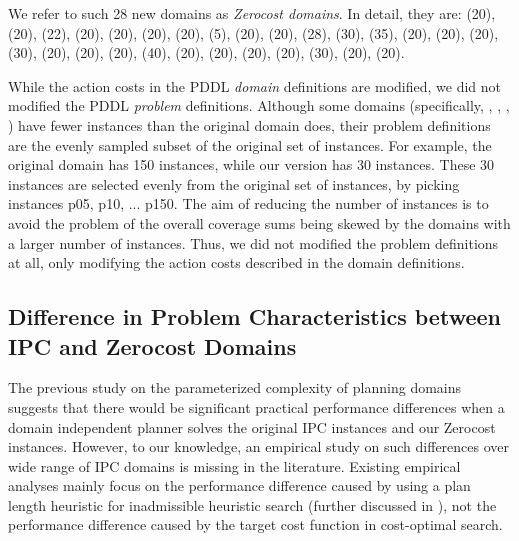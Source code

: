 We refer to such 28 new domains as \emph{Zerocost domains}.
In detail, they are:
 (20),  (20),  (22),  (20),
 (20),  (20),  (20),  (5),
 (20),  (20),  (28),  (30),
 (35),  (20),  (20),
 (20),  (30),  (20),
 (20),  (20),  (40),
 (20),  (20),  (20),
 (20),  (30),  (20),
 (20).

While the action costs in the PDDL \emph{domain} definitions are modified,
we did not modified the PDDL \emph{problem} definitions.
Although some domains (specifically, , , , ) have fewer instances than the original domain does,
their problem definitions are the evenly sampled subset of the original set of instances.
For example, the original  domain has 150 instances, while our version has 30 instances.
These 30 instances are selected evenly from the original set of instances, by picking instances p05, p10, ... p150.
% 
The aim of reducing the number of instances is to avoid the problem of the overall coverage sums being skewed by the domains with a larger number of instances.
Thus, we did not modified the problem definitions at all, only modifying the action costs described in the domain definitions.

\subsection{Difference in Problem Characteristics between IPC and Zerocost Domains}

The previous study on the parameterized complexity of planning domains \cite{aghighi2015} suggests %
that there would be significant practical performance differences when a domain independent planner solves the original IPC instances and our Zerocost instances.
However, to our knowledge, an empirical study on such differences over wide range of IPC domains is missing in the literature.
Existing empirical analyses mainly focus on the performance difference caused by using a plan length heuristic for inadmissible heuristic search (further discussed in ), not the performance difference caused by the target cost function in cost-optimal search.

